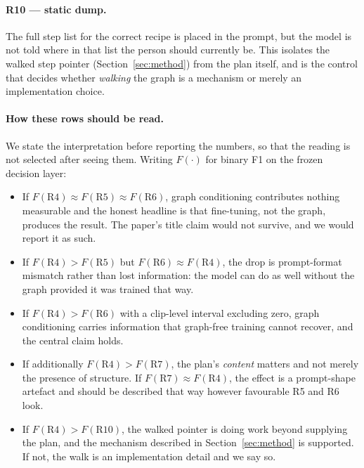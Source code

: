 \documentclass[10pt,twocolumn]{article}
\begin{document}
\paragraph{R10 --- static dump.} The full step list for the correct recipe is
placed in the prompt, but the model is not told where in that list the person
should currently be. This isolates the walked step pointer
(Section~\ref{sec:method}) from the plan itself, and is the control that decides
whether \emph{walking} the graph is a mechanism or merely an implementation
choice.

\paragraph{How these rows should be read.} We state the interpretation before
reporting the numbers, so that the reading is not selected after seeing them.
Writing $F(\cdot)$ for binary F1 on the frozen decision layer:

\begin{itemize}\itemsep2pt
\item If $F(\text{R4}) \approx F(\text{R5}) \approx F(\text{R6})$, graph
      conditioning contributes nothing measurable and the honest headline is
      that fine-tuning, not the graph, produces the result. The paper's title
      claim would not survive, and we would report it as such.
\item If $F(\text{R4}) > F(\text{R5})$ but $F(\text{R6}) \approx F(\text{R4})$,
      the drop is prompt-format mismatch rather than lost information: the model
      can do as well without the graph provided it was trained that way.
\item If $F(\text{R4}) > F(\text{R6})$ with a clip-level interval excluding
      zero, graph conditioning carries information that graph-free training
      cannot recover, and the central claim holds.
\item If additionally $F(\text{R4}) > F(\text{R7})$, the plan's \emph{content}
      matters and not merely the presence of structure. If $F(\text{R7}) \approx
      F(\text{R4})$, the effect is a prompt-shape artefact and should be
      described that way however favourable R5 and R6 look.
\item If $F(\text{R4}) > F(\text{R10})$, the walked pointer is doing work beyond
      supplying the plan, and the mechanism described in
      Section~\ref{sec:method} is supported. If not, the walk is an
      implementation detail and we say so.
\end{itemize}
\end{document}
